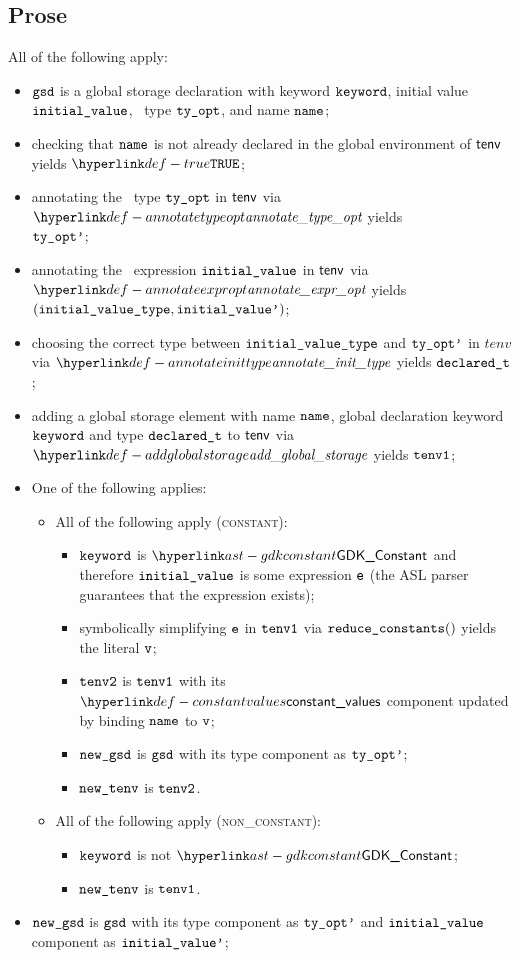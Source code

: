 \subsection{Prose}
All of the following apply:
\begin{itemize}
  \item $\texttt{gsd}$ is a global storage declaration with keyword $\texttt{keyword}$, initial value \\ $\texttt{initial\_value}$,
        \optional\ type $\texttt{ty\_opt}$, and name $\texttt{name}$;
  \item checking that $\texttt{name}$ is not already declared in the global environment of $\textsf{tenv}$ yields $\True$\ProseOrTypeError;
  \item annotating the \optional\ type $\texttt{ty\_opt}$ in $\textsf{tenv}$ via $\annotatetypeopt$ yields \\
        $\texttt{ty\_opt'}$\ProseOrTypeError;
  \item annotating the \optional\ expression $\texttt{initial\_value}$ in $\textsf{tenv}$ via $\annotateexpropt$ yields
        $(\texttt{initial\_value\_type}, \texttt{initial\_value'})$\ProseOrTypeError;
  \item choosing the correct type between $\texttt{initial\_value\_type}$ and $\texttt{ty\_opt'}$ in $tenv$ via $\annotateinittype$ yields
        $\texttt{declared\_t}$;
  \item adding a global storage element with name $\texttt{name}$, global declaration keyword \\ $\texttt{keyword}$ and type $\texttt{declared\_t}$
        to $\textsf{tenv}$ via $\addglobalstorage$ yields $\texttt{tenv1}$\ProseOrTypeError;
  \item One of the following applies:
  \begin{itemize}
    \item All of the following apply (\textsc{constant}):
    \begin{itemize}
      \item $\texttt{keyword}$ is $\GDKConstant$ and therefore $\texttt{initial\_value}$ is some expression $\texttt{e}$ (the ASL parser guarantees
            that the expression exists);
      \item symbolically simplifying $\texttt{e}$ in $\texttt{tenv1}$ via $\reduceconstants$ yields the literal $\texttt{v}$\ProseOrTypeError;
      \item $\texttt{tenv2}$ is $\texttt{tenv1}$ with its $\constantvalues$ component updated by binding $\texttt{name}$ to $\texttt{v}$;
      \item $\texttt{new\_gsd}$ is $\texttt{gsd}$ with its type component as $\texttt{ty\_opt'}$;
      \item $\texttt{new\_tenv}$ is $\texttt{tenv2}$.
    \end{itemize}

    \item All of the following apply (\textsc{non\_constant}):
    \begin{itemize}
      \item $\texttt{keyword}$ is not $\GDKConstant$;
      \item $\texttt{new\_tenv}$ is $\texttt{tenv1}$.
    \end{itemize}
  \end{itemize}
  \item $\texttt{new\_gsd}$ is $\texttt{gsd}$ with its type component as $\texttt{ty\_opt'}$ and $\texttt{initial\_value}$ component as $\texttt{initial\_value'}$;
\end{itemize}

